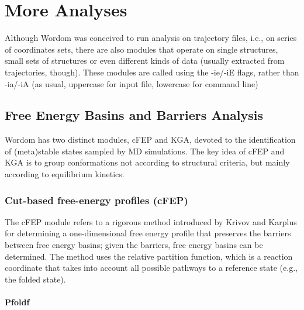 \documentclass[11pt,twoside,onecolumn,a4paper,openright,notitlepage]{book}[2001/04/21]
\begin{document}
\chapter{More Analyses}

Although Wordom was conceived to run analysis on trajectory files, i.e., on series of coordinates sets, there are also modules that operate on single structures, small sets of structures or even different kinds of data (usually extracted from trajectories, though).
These modules are called using the -ie/-iE flags, rather than -ia/-iA (as usual, uppercase for input file, lowercase for command line)

\section{Free Energy Basins and Barriers Analysis}

Wordom has two distinct modules, cFEP and KGA, devoted to the identification of (meta)stable states sampled by MD simulations. The key idea of cFEP and KGA is to group conformations not according to structural criteria, but mainly according to equilibrium kinetics.

\subsection{Cut-based free-energy profiles (cFEP)}

The cFEP module refers to a rigorous method introduced by Krivov and Karplus\cite{Krivov:One} for determining a one-dimensional free energy profile that preserves the barriers between free energy basins; given the barriers, free energy basins can be determined. The method uses the relative partition function, which is a reaction coordinate that takes into account all possible pathways to a reference state (e.g., the folded state).

\subsubsection{Pfoldf}
\end{document}
